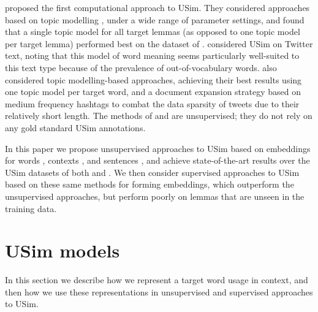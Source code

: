 \documentclass[11pt]{article}
\begin{document}
\cite{LuiBaldwin2012} proposed the first computational approach to
USim. They considered approaches based on topic modelling
\citep{Blei2003}, under a wide range of parameter settings, and found
that a single topic model for all target lemmas (as opposed to one
topic model per target lemma) 
performed best on the dataset of \cite{Erk2009b}. \cite{Gella+:2013}
considered USim on Twitter text, noting that this model of word
meaning seems particularly well-suited to this text type because of
the prevalence of out-of-vocabulary words. \citeauthor{Gella+:2013}
also considered topic modelling-based approaches, achieving their best
results using one topic model per target word, and a document
expansion strategy based on medium frequency hashtags to combat the
data sparsity of tweets due to their relatively short length. The
methods of \citeauthor{LuiBaldwin2012} and \citeauthor{Gella+:2013}
are unsupervised; they do not rely on any gold standard USim
annotations.

In this paper we propose unsupervised approaches to USim based on
embeddings for words \citep{Mikolov+:2013b, pennington2014glove},
contexts \citep{melamud2016context2vec}, and sentences
\citep{Kiros+:2015}, and achieve state-of-the-art results over the
USim datasets of both \cite{Erk2009b} and \cite{Gella+:2013}. We then
consider supervised approaches to USim based on these same methods for
forming embeddings, which outperform the unsupervised approaches, but
perform poorly on lemmas that are unseen in the training data.

\section{USim models\label{sec:model}}



In this section we describe how we represent a target word usage in
context, and then how we use these representations in unsupervised and
supervised approaches to USim.
\end{document}
